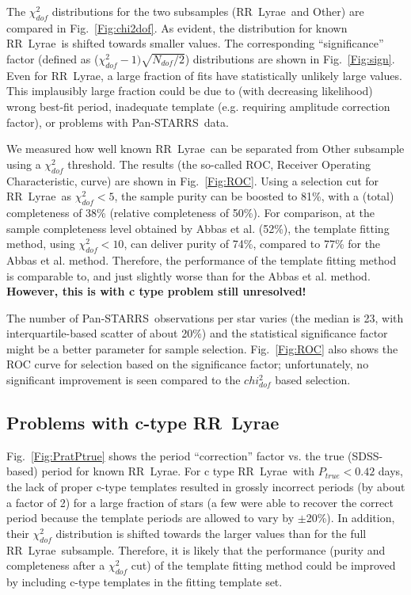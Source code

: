 \documentclass[12pt, preprint]{aastex}
\def\PS  {\hbox{Pan-STARRS}}
\def\RR  {\hbox{RR Lyrae}}
\begin{document}
The $\chi^2_{dof}$ distributions for the two subsamples (\RR\ and Other) are compared in 
Fig.~\ref{Fig:chi2dof}. As evident, the distribution for known \RR\ is shifted towards smaller
values. The corresponding ``significance'' factor (defined as ($\chi^2_{dof}-1) \sqrt{N_{dof}/2}$) 
distributions are shown in Fig.~\ref{Fig:sign}. Even for \RR, a large fraction of fits have
statistically unlikely large values. This implausibly large fraction could be due to (with
decreasing likelihood) wrong best-fit period, inadequate template (e.g. requiring amplitude 
correction factor), or problems with \PS\ data. 

We measured how well known \RR\ can be separated from Other subsample using 
a $\chi^2_{dof}$ threshold. The results (the so-called ROC, Receiver Operating Characteristic, 
curve) are shown in Fig.~\ref{Fig:ROC}. Using a
selection cut for \RR\ as $\chi^2_{dof} < 5$, the sample purity can be boosted to 81\%, 
with a (total) completeness of 38\% (relative completeness of 50\%). For comparison,
at the sample completeness level obtained by Abbas et al. (52\%), the template fitting 
method, using $\chi^2_{dof} < 10$, can deliver purity of 74\%, compared to 77\% for the 
Abbas et al. method.  Therefore, the performance of the template fitting method is comparable
to, and just slightly worse than for the Abbas et al. method.  {\bf However, this is with 
c type problem still unresolved!}  

The number of \PS\ observations per star varies (the median is 23, with interquartile-based
scatter of about 20\%) and the statistical significance factor might be a better parameter
for sample selection. Fig.~\ref{Fig:ROC} also shows the ROC curve for selection based on 
the significance factor; unfortunately, no significant improvement is seen compared to 
the $chi^2_{dof}$ based selection. 



\subsection{Problems with c-type \RR} 

Fig.~\ref{Fig:PratPtrue} shows the period ``correction'' factor vs. the true (SDSS-based) period 
for known \RR. For c type \RR\ with $P_{true} <0.42$ days, the lack of proper c-type  templates 
resulted in grossly incorrect periods (by about a factor of 2) for a large fraction of stars
(a few were able to recover the correct period because the template periods are allowed to 
vary by $\pm$20\%). In addition, their $\chi^2_{dof}$ distribution is shifted towards the larger
values than for the full \RR\ subsample. Therefore, it is likely that the performance (purity and 
completeness after a $\chi^2_{dof}$ cut) of the template fitting method could be improved by 
including c-type templates in the fitting template set. 
\end{document}
